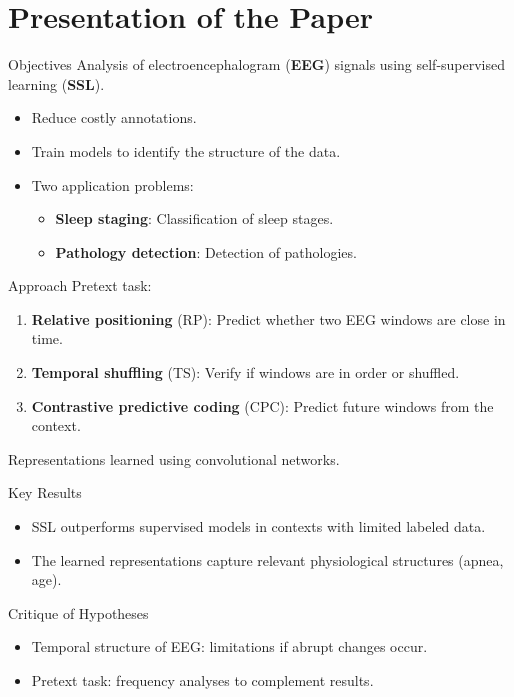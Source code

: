 \section{Presentation of the Paper}

\begin{frame}{Objectives}
Analysis of electroencephalogram (\textbf{EEG}) signals using self-supervised learning (\textbf{SSL}).
\begin{itemize}
    \item Reduce costly annotations.
    \item Train models to identify the structure of the data.
    \item Two application problems:
    \begin{itemize}
        \item \textbf{Sleep staging}: Classification of sleep stages.
        \item \textbf{Pathology detection}: Detection of pathologies.
    \end{itemize}
\end{itemize}
\end{frame}

\begin{frame}{Approach}
Pretext task:
    \begin{enumerate}
        \item \textbf{Relative positioning} (RP): Predict whether two EEG windows are close in time.
        \item \textbf{Temporal shuffling} (TS): Verify if windows are in order or shuffled.
        \item \textbf{Contrastive predictive coding} (CPC): Predict future windows from the context.
    \end{enumerate}
Representations learned using convolutional networks.
\end{frame}

\begin{frame}{Key Results}
\begin{itemize}
    \item SSL outperforms supervised models in contexts with limited labeled data.
    \item The learned representations capture relevant physiological structures (apnea, age).
\end{itemize}
\end{frame}

\begin{frame}{Critique of Hypotheses}
\begin{itemize}
    \item Temporal structure of EEG: limitations if abrupt changes occur.
    \item Pretext task: frequency analyses to complement results.
\end{itemize}
\end{frame}
